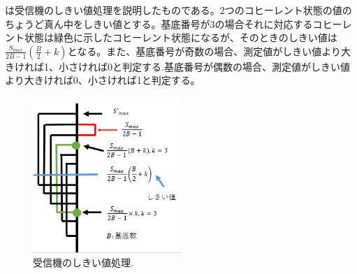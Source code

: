 は受信機のしきい値処理を説明したものである。2つのコヒーレント状態の値のちょうど真ん中をしきい値とする。基底番号が3の場合それに対応するコヒーレント状態は緑色に示したコヒーレント状態になるが、そのときのしきい値は$\frac{S_{max}}{2B-1}(\frac{B}{2}+k)$となる。また、基底番号が奇数の場合、測定値がしきい値より大きければ1、小さければ0と判定する.基底番号が偶数の場合、測定値がしきい値より大きければ0、小さければ1と判定する。

\begin{figure}[htbp]
        \centering   
        \includegraphics[width=0.5\textwidth]{img/zemi5.png}
        \caption[sample image (png)]{受信機のしきい値処理.}
        \label{Fig:4_3}
    \end{figure}


